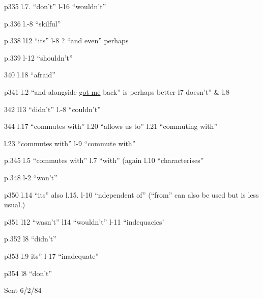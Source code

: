 
p335 l.7. ``don't'' l-16 ``wouldn't''

\noindent{}p.336 l.-8 ``skilful''

p.338 l12 ``its'' l-8 ? ``and even'' perhaps

p.339 l-12 ``shouldn't'' 

340 l.18 ``afraid''

p341 l.2 ``and alongside \uline{got me} back'' is perhaps better l7 doesn't'' \& l.8

342 l13 ``didn't'' l.-8 ``couldn't''

344 l.17 ``commutes with'' l.20 ``allows us to'' l.21 ``commuting with''

l.23 ``commutes with'' l-9 ``commute with''

p.345 l.5 ``commutes with'' l.7 ``with'' (again l.10 ``characterises''

p.348 l-2 ``won't''

p350 l.14 ``its'' also  l.15. l-10 ``ndependent of'' (``from'' can also be used but is less usual.)

p351 l12 ``wasn't'' l14 ``wouldn't'' l-11 ``indequacies'

p.352 l8 ``didn't''

p353 l.9 its'' l-17 ``inadequate''

p354 l8 ``don't''

Sent 6/2/84


